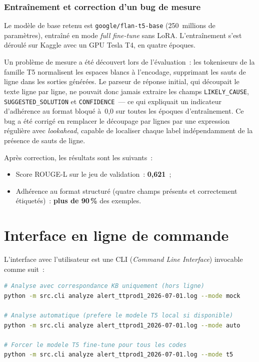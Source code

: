\documentclass[12pt,a4paper]{report}
\begin{document}
\subsubsection{Entra\^inement et correction d'un bug de mesure}

Le mod\`ele de base retenu est \texttt{google/flan-t5-base} (250~millions de
param\`etres), entra\^in\'e en mode \emph{full fine-tune} sans LoRA. L'entra\^inement
s'est d\'eroul\'e sur Kaggle avec un GPU Tesla T4, en quatre \'epoques.

Un probl\`eme de mesure a \'et\'e d\'ecouvert lors de l'\'evaluation~: les tokeniseurs
de la famille T5 normalisent les espaces blancs \`a l'encodage, supprimant les sauts
de ligne dans les sorties g\'en\'er\'ees. Le parseur de r\'eponse initial, qui d\'ecoupait
le texte ligne par ligne, ne pouvait donc jamais extraire les champs
\texttt{LIKELY\_CAUSE}, \texttt{SUGGESTED\_SOLUTION} et \texttt{CONFIDENCE}~---
ce qui expliquait un indicateur d'adh\'erence au format bloqu\'e \`a~0,0 sur toutes
les \'epoques d'entra\^inement. Ce bug a \'et\'e corrig\'e en remplacer le d\'ecoupage
par lignes par une expression r\'eguli\`ere avec \emph{lookahead}, capable de localiser
chaque label ind\'ependamment de la pr\'esence de sauts de ligne.

Apr\`es correction, les r\'esultats sont les suivants~:

\begin{itemize}[leftmargin=*]
  \item Score ROUGE-L sur le jeu de validation~: \textbf{0,621}~;
  \item Adh\'erence au format structur\'e (quatre champs pr\'esents et correctement
        \'etiquet\'es)~: \textbf{plus de 90\,\%} des exemples.
\end{itemize}

\section{Interface en ligne de commande}

L'interface avec l'utilisateur est une CLI (\emph{Command Line Interface}) invocable
comme suit~:

\begin{lstlisting}[language=bash,caption={Exemples d'utilisation de la CLI},label=lst:cli]
# Analyse avec correspondance KB uniquement (hors ligne)
python -m src.cli analyze alert_ttprod1_2026-07-01.log --mode mock

# Analyse automatique (prefere le modele T5 local si disponible)
python -m src.cli analyze alert_ttprod1_2026-07-01.log --mode auto

# Forcer le modele T5 fine-tune pour tous les codes
python -m src.cli analyze alert_ttprod1_2026-07-01.log --mode t5
\end{lstlisting}
\end{document}
